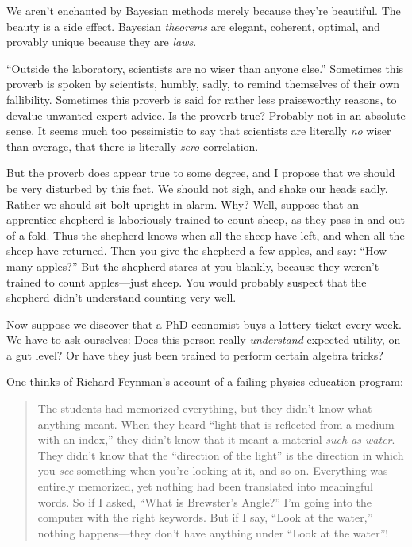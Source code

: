 {
 We aren't enchanted by Bayesian methods merely
because they're beautiful. The beauty is a side effect.
Bayesian \textit{theorems} are elegant, coherent, optimal, and provably
unique because they are \textit{laws}.}

\myendsectiontext


\bigskip


{
 ``Outside the laboratory, scientists are no wiser
than anyone else.'' Sometimes this proverb is spoken
by scientists, humbly, sadly, to remind themselves of their own
fallibility. Sometimes this proverb is said for rather less
praiseworthy reasons, to devalue unwanted expert advice. Is the proverb
true? Probably not in an absolute sense. It seems much too pessimistic
to say that scientists are literally \textit{no} wiser than average,
that there is literally \textit{zero} correlation. }

{
 But the proverb does appear true to some degree, and I propose
that we should be very disturbed by this fact. We should not sigh, and
shake our heads sadly. Rather we should sit bolt upright in alarm. Why?
Well, suppose that an apprentice shepherd is laboriously trained to
count sheep, as they pass in and out of a fold. Thus the shepherd knows
when all the sheep have left, and when all the sheep have returned.
Then you give the shepherd a few apples, and say:
``How many apples?'' But the
shepherd stares at you blankly, because they weren't
trained to count apples---just sheep. You would probably suspect that
the shepherd didn't understand counting very well.}

{
 Now suppose we discover that a PhD economist buys a lottery ticket
every week. We have to ask ourselves: Does this person really
\textit{understand} expected utility, on a gut level? Or have they just
been trained to perform certain algebra tricks?}

{
 One thinks of Richard Feynman's account of a
failing physics education program:}

\begin{quote}
{
 The students had memorized everything, but they
didn't know what anything meant. When they heard
``light that is reflected from a medium with an
index,'' they didn't know that it
meant a material \textit{such as water}. They didn't
know that the ``direction of the
light'' is the direction in which you \textit{see}
something when you're looking at it, and so on.
Everything was entirely memorized, yet nothing had been translated into
meaningful words. So if I asked, ``What is
Brewster's Angle?''
I'm going into the computer with the right keywords.
But if I say, ``Look at the water,''
nothing happens---they don't have anything under
``Look at the water''!}
\end{quote}

